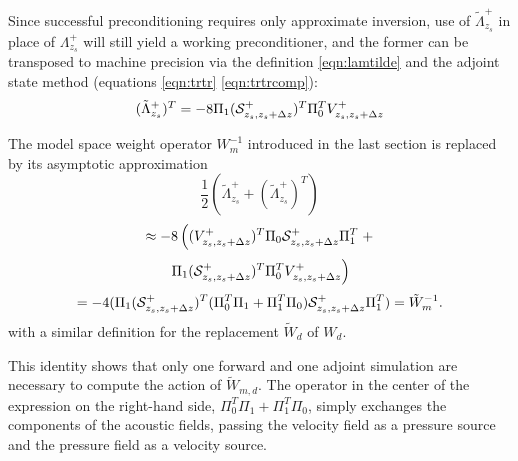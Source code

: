 \documentclass[georeport,12pt]{geophysics}
\begin{document}
Since successful preconditioning requires only approximate inversion,
use of $\tilde{\Lambda}^+_{z_s} $ in place of $\Lambda^+_{z_s}$ will
still yield a working preconditioner, and the former can be transposed
to machine precision via the definition \ref{eqn:lamtilde} and the adjoint state
method (equations \ref{eqn:trtr} \ref{eqn:trtrcomp}):
\begin{equation}
  \label{eqn:lamtransp}
  (\tilde{\Lambda}^+_{z_s})^T = -8 \Pi_1 ({\cal S}^+_{z_s,z_s+\Delta
    z})^T\Pi_0^T V^{+}_{z_s,z_s+\Delta z}
\end{equation}


The model space weight operator $W_m^{-1}$ introduced in the last section is
replaced by its asymptotic approximation
\[
\frac{1}{2}(\tilde{\Lambda}^+_{z_s} +
  (\tilde{\Lambda}^+_{z_s})^T)
\]
\[
  \approx -8 \left((V^{+}_{z_s,z_s+\Delta z})^T\Pi_0 {\cal
    S}^+_{z_s,z_s+\Delta z}\Pi_1^T \right.+
\]
\[
  \left. \Pi_1 ({\cal S}^+_{z_s,z_s+\Delta
      z})^T\Pi_0^T V^{+}_{z_s,z_s+\Delta z}\right)
\]
\begin{equation}
  \label{eqn:winvcomp}
  = -4(\Pi_1 ({\cal S}^+_{z_s,z_s+\Delta z})^T(\Pi_0^T\Pi_1 +
  \Pi_1^T\Pi_0) {\cal S}^+_{z_s,z_s+\Delta z}\Pi_1^T) = \tilde{W}_m^{-1} .
\end{equation}
with a similar definition for the replacement $\tilde{W}_d$ of $W_d$.

This identity shows that only one forward and one adjoint simulation
are necessary to compute the action of $\tilde{W}_{m,d}$. The operator
in the center of the expression on the right-hand side, $\Pi_0^T\Pi_1
+ \Pi_1^T\Pi_0$, simply exchanges the components of the acoustic
fields, passing the velocity field as a pressure source and the
pressure field as a velocity source.
\end{document}
